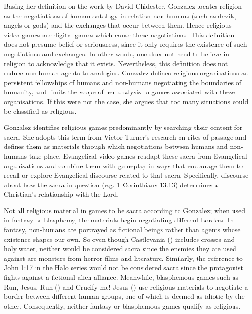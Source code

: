 Basing her definition on the work by David Chidester, Gonzalez locates religion as the negotiations of human ontology in relation non-humans (such as devils, angels or gods) and the exchanges that occur between them. Hence religious video games are digital games which cause these negotiations. This definition does not presume belief or seriousness, since it only requires the existence of such negotiations and exchanges. In other words, one does not need to believe in religion to acknowledge that it exists. Nevertheless, this definition does not reduce non-human agents to analogies. Gonzalez defines religious organisations as persistent fellowships of humans and non-humans negotiating the boundaries of humanity, and limits the scope of her analysis to games associated with these organisations. If this were not the case, she argues that too many situations could be classified as religious.
 
Gonzalez identifies religious games predominantly by searching their content for sacra. She adopts this term from Victor Turner’s research on rites of passage and defines them as materials through which negotiations between humans and non-humans take place. Evangelical video games readapt these sacra from Evangelical organisations and combine them with gameplay in ways that encourage them to recall or explore Evangelical discourse related to that sacra. Specifically, discourse about how the sacra in question (e.g. 1 Corinthians 13:13) determines a Christian’s relationship with the Lord.


Not all religious material in games to be sacra according to Gonzalez; when used in fantasy or blasphemy, the materials begin negotiating different borders. In fantasy, non-humans are portrayed as fictional beings rather than agents whose existence shapes our own. So even though Castlevania () includes crosses and holy water, neither would be considered sacra since the enemies they are used against are monsters from horror films and literature. Similarly, the reference to John 1:17 in the Halo series would not be considered sacra since the protagonist fights against a fictional alien alliance. Meanwhile, blasphemous games such as Run, Jesus, Run () and Crucify-me! Jesus () use religious materials to negotiate a border between different human groups, one of which is deemed as idiotic by the other. Consequently, neither fantasy or blasphemous games qualify as religious.

